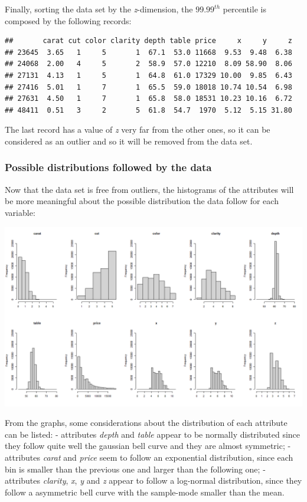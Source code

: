 \documentclass[
]{article}
\begin{document}
Finally, sorting the data set by the \emph{z}-dimension, the
\(99.99^{th}\) percentile is composed by the following records:

\begin{verbatim}
##       carat cut color clarity depth table price     x     y     z
## 23645  3.65   1     5       1  67.1  53.0 11668  9.53  9.48  6.38
## 24068  2.00   4     5       2  58.9  57.0 12210  8.09 58.90  8.06
## 27131  4.13   1     5       1  64.8  61.0 17329 10.00  9.85  6.43
## 27416  5.01   1     7       1  65.5  59.0 18018 10.74 10.54  6.98
## 27631  4.50   1     7       1  65.8  58.0 18531 10.23 10.16  6.72
## 48411  0.51   3     2       5  61.8  54.7  1970  5.12  5.15 31.80
\end{verbatim}

The last record has a value of \emph{z} very far from the other ones, so
it can be considered as an outlier and so it will be removed from the
data set.

\subsubsection{Possible distributions followed by the
data}\label{possible-distributions-followed-by-the-data}

Now that the data set is free from outliers, the histograms of the
attributes will be more meaningful about the possible distribution the
data follow for each variable:

\begin{center}\includegraphics[width=0.6\linewidth]{Images/hist_wo_out} \end{center}

From the graphs, some considerations about the distribution of each
attribute can be listed: - attributes \emph{depth} and \emph{table}
appear to be normally distributed since they follow quite well the
gaussian bell curve and they are almost symmetric; - attributes
\emph{carat} and \emph{price} seem to follow an exponential
distribution, since each bin is smaller than the previous one and larger
than the following one; - attributes \emph{clarity}, \emph{x}, \emph{y}
and \emph{z} appear to follow a log-normal distribution, since they
follow a asymmetric bell curve with the sample-mode smaller than the
mean.
\end{document}
